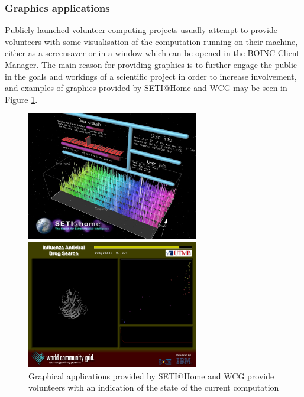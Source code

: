 \subsubsection{Graphics applications} \label{Bgraphics}
Publicly-launched volunteer computing projects usually attempt to provide volunteers with some visualisation of the computation running on their machine, either as a screensaver or in a window which can be opened in the BOINC Client Manager. The main reason for providing graphics is to further engage the public in the goals and workings of a scientific project in order to increase involvement, and examples of graphics provided by SETI@Home and WCG may be seen in Figure \ref{fig:boincgraphics}.
\begin{figure}[htb]
\centering
\begin{minipage}{7.5cm}
\includegraphics[width=7.5cm]{images/graphics1}
 \end{minipage} \hspace{.1cm}
\begin{minipage}{7.5cm}
\includegraphics[width=7.5cm]{images/graphics2}
 \end{minipage}
\caption{Graphical applications provided by SETI@Home and WCG provide volunteers with an indication of the state of the current computation} \label{fig:boincgraphics}
\end{figure}
